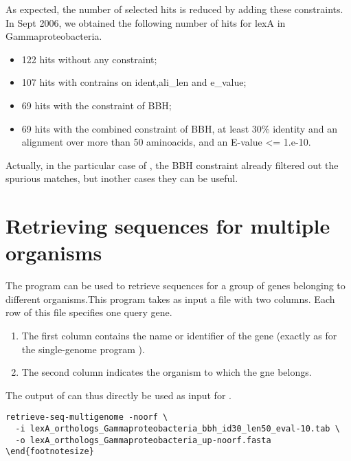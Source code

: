 As expected, the number of selected hits is reduced by adding these
constraints. In Sept 2006, we obtained the following number of hits
for lexA in Gammaproteobacteria.

\begin{itemize}
\item 122 hits without any constraint;
\item 107 hits with contrains on ident,ali\_len and e\_value;
\item 69 hits with the constraint of BBH;
\item 69 hits with the combined constraint of BBH, at least 30\%
  identity and an alignment over more than 50 aminoacids, and an
  E-value <= 1.e-10.
\end{itemize}

Actually, in the particular case of , the BBH constraint
already filtered out the spurious matches, but inother cases they can
be useful.

\section{Retrieving sequences for multiple organisms}

The program  can be used to retrieve
sequences for a group of genes belonging to different organisms.This
program takes as input a file with two columns. Each row of this file
specifies one query gene.

\begin{enumerate}

\item The first column contains the name or identifier of the gene
  (exactly as for the single-genome program ).

\item The second column indicates the organism to which the gne belongs.

\end{enumerate}

The output of  can thus directly be used as
input for .

\begin{footnotesize}
\begin{verbatim}
retrieve-seq-multigenome -noorf \
  -i lexA_orthologs_Gammaproteobacteria_bbh_id30_len50_eval-10.tab \
  -o lexA_orthologs_Gammaproteobacteria_up-noorf.fasta
\end{footnotesize}
\end{verbatim}
\end{footnotesize}

